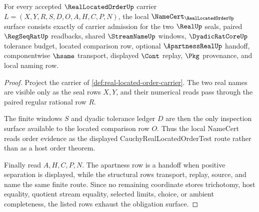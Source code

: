 \begin{theorem}
\label{thm:real-located-order-namecert-obligations}
For every accepted $\RealLocatedOrderUp$ carrier $L=(X,Y,R,S,D,O,A,H,C,P,N)$, the local $\NameCert_{\RealLocatedOrderUp}$ surface consists exactly of carrier admission for the two $\RealUp$ seals, paired $\RegSeqRatUp$ readbacks, shared $\StreamNameUp$ windows, $\DyadicRatCoreUp$ tolerance budget, located comparison row, optional $\ApartnessRealUp$ handoff, componentwise $\hsame$ transport, displayed $\Cont$ replay, $\Pkg$ provenance, and local naming row.
\end{theorem}
\begin{proof}
Project the carrier of \autoref{def:real-located-order-carrier}. The two real names are visible only as the seal rows $X,Y$, and their numerical reads pass through the paired regular rational row $R$.

The finite windows $S$ and dyadic tolerance ledger $D$ are then the only inspection surface available to the located comparison row $O$. Thus the local NameCert reads order evidence as the displayed CauchyRealLocatedOrderTest route rather than as a host order theorem.

Finally read $A,H,C,P,N$. The apartness row is a handoff when positive separation is displayed, while the structural rows transport, replay, source, and name the same finite route. Since no remaining coordinate stores trichotomy, host equality, quotient stream equality, selected limits, choice, or ambient completeness, the listed rows exhaust the obligation surface.
\end{proof}

